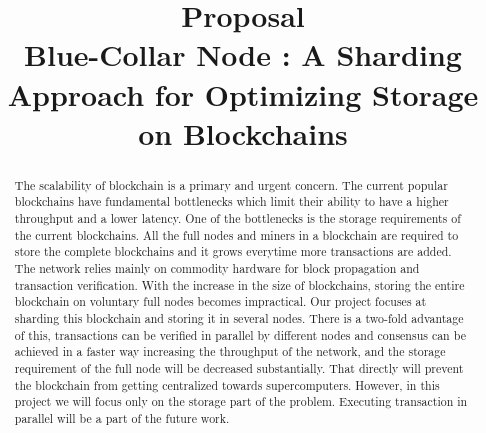 \documentclass[conference]{IEEEtran}
\begin{document}
\title{Proposal\\
Blue-Collar Node : A Sharding Approach for Optimizing Storage on Blockchains
}

\author{
\and
{}
}

\maketitle

\begin{abstract}
    The scalability of blockchain is a primary and urgent concern. The current
    popular blockchains have fundamental bottlenecks which limit their ability
    to have a higher throughput and a lower latency. One of the bottlenecks is
    the storage requirements of the current blockchains. All the full nodes and
    miners in a blockchain are required to store the complete blockchains and it
    grows everytime more transactions are added. The network relies mainly on
    commodity hardware for block propagation and transaction verification.
    With the increase in the size of blockchains, storing the entire blockchain
    on voluntary full nodes becomes impractical. Our project focuses at sharding
    this blockchain and storing it in several nodes. There is a two-fold advantage of this,
    transactions can be verified in parallel by different nodes and consensus
    can be achieved in a faster way increasing the throughput of the network,
    and the storage requirement of the full node will be decreased
    substantially. That directly will prevent the blockchain from getting
    centralized towards supercomputers. However, in this project we will focus
    only on the storage part of the problem. Executing transaction in parallel
    will be a part of the future work.

\end{abstract}
\end{document}
